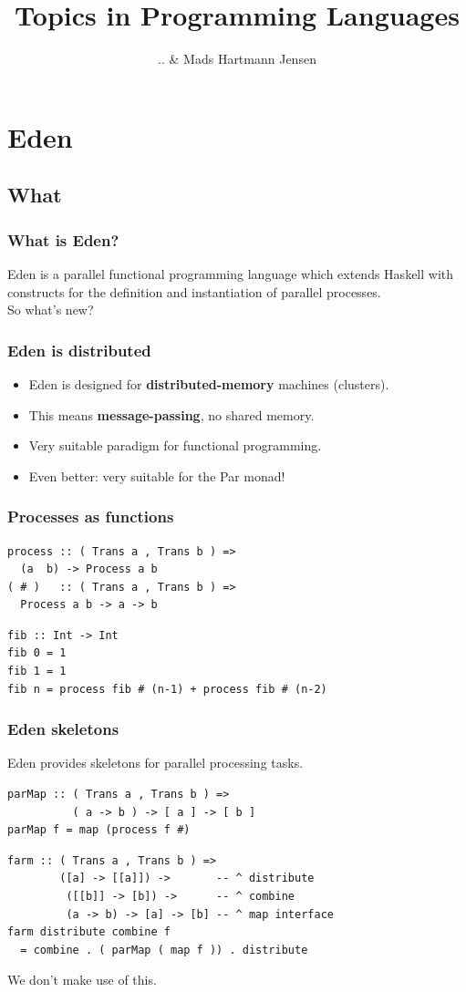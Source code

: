\documentclass[12pt, danish]{beamer}
\title{Topics in Programming Languages}
\author{.. \& Mads Hartmann Jensen}
\begin{document}
\begin{frame}
\titlepage
\end{frame}

\section{Eden}

\subsection{What}

\begin{frame}
\frametitle{What is Eden?}

Eden is a parallel functional programming language which extends
Haskell with constructs for the definition and instantiation of
parallel processes.\\
\pause
So what's new?
\end{frame}

\begin{frame}
\frametitle{Eden is distributed}

\begin{itemize}
\item Eden is designed for \textbf{distributed-memory} machines
  (clusters).\pause
\item This means \textbf{message-passing}, no shared memory.\pause
\item Very suitable paradigm for functional programming.\pause
\item Even better: very suitable for the Par monad!
\end{itemize}
\end{frame}

\begin{frame}[fragile]
\frametitle{Processes as functions}

\begin{verbatim}
process :: ( Trans a , Trans b ) =>
  (a  b) -> Process a b
( # )   :: ( Trans a , Trans b ) =>
  Process a b -> a -> b
\end{verbatim}
\pause
\begin{verbatim}
fib :: Int -> Int
fib 0 = 1
fib 1 = 1
fib n = process fib # (n-1) + process fib # (n-2)
\end{verbatim}
\end{frame}

\begin{frame}[fragile]
\frametitle{Eden skeletons}

Eden provides skeletons for parallel processing tasks.

\begin{verbatim}
parMap :: ( Trans a , Trans b ) =>
          ( a -> b ) -> [ a ] -> [ b ]
parMap f = map (process f #)
\end{verbatim}
\pause
\begin{verbatim}
farm :: ( Trans a , Trans b ) =>
        ([a] -> [[a]]) ->       -- ^ distribute
         ([[b]] -> [b]) ->      -- ^ combine
         (a -> b) -> [a] -> [b] -- ^ map interface
farm distribute combine f
  = combine . ( parMap ( map f )) . distribute
\end{verbatim}
\pause
We don't make use of this.
\end{frame}
\end{document}
